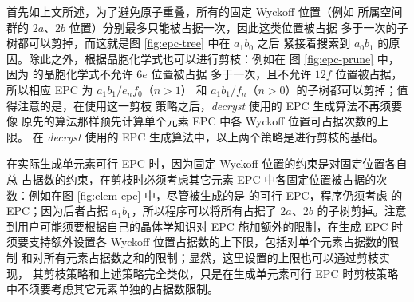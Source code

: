 \begin{figure}[htbp!]
\begin{floatrow}
\setlength{\columnsep}{3em}
\end{floatrow}
\end{figure}

首先如上文所述，为了避免原子重叠，所有的固定 Wyckoff 位置（例如 
所属空间群的 $2a$、$2b$ 位置）分别最多只能被占据一次，因此这类位置被占据
多于一次的子树都可以剪掉，而这就是图 \ref{fig:epc-tree} 中在 $a_1b_0$ 之后
紧接着搜索到 $a_0b_1$ 的原因。除此之外，根据晶胞化学式也可以进行剪枝：例如在
图 \ref{fig:epc-prune} 中，因为  的晶胞化学式不允许 $6e$ 位置被占据
多于一次，且不允许 $12f$ 位置被占据，所以相应 EPC 为 $a_1b_1/e_nf_0$（$n > 1$）
和 $a_1b_1/f_n$（$n > 0$）的子树都可以剪掉；值得注意的是，在使用这一剪枝
策略之后，\emph{decryst} 使用的 EPC 生成算法不再须要像 \textcite{deng2009}%
原先的算法那样预先计算单个元素 EPC 中各 Wyckoff 位置可占据次数的上限。
在 \emph{decryst} 使用的 EPC 生成算法中，以上两个策略是进行剪枝的基础。

在实际生成单元素可行 EPC 时，因为固定 Wyckoff 位置的约束是对固定位置各自总
占据数的约束，在剪枝时必须考虑其它元素 EPC 中各固定位置被占据的次数：例如在图
\ref{fig:elem-epc} 中，尽管被生成的是  的可行 EPC，程序仍须考虑
 的 EPC；因为后者占据 $a_1b_1$，所以程序可以将所有占据了 $2a$、$2b$
的子树剪掉。注意到用户可能须要根据自己的晶体学知识对 EPC 施加额外的限制，在生成
EPC 时须要支持额外设置各 Wyckoff 位置占据数的上下限，包括对单个元素占据数的限制
和对所有元素占据数之和的限制；显然，这里设置的上限也可以通过剪枝实现，
其剪枝策略和上述策略完全类似，只是在生成单元素可行 EPC
时剪枝策略中不须要考虑其它元素单独的占据数限制。

